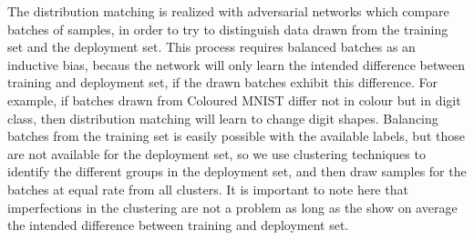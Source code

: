 The distribution matching is realized with adversarial networks which compare batches of samples,
in order to try to distinguish data drawn from the training set and the deployment set.
This process requires balanced batches as an inductive bias,
becaus the network will only learn the intended difference between training and deployment set,
if the drawn batches exhibit this difference.
For example, if batches drawn from Coloured MNIST differ not in colour but in digit class,
then distribution matching will learn to change digit shapes.
Balancing batches from the training set is easily possible with the available labels,
but those are not available for the deployment set,
so we use clustering techniques to identify the different groups in the deployment set,
and then draw samples for the batches at equal rate from all clusters.
It is important to note here that imperfections in the clustering are not a problem
as long as the show on average the intended difference between training and deployment set.
